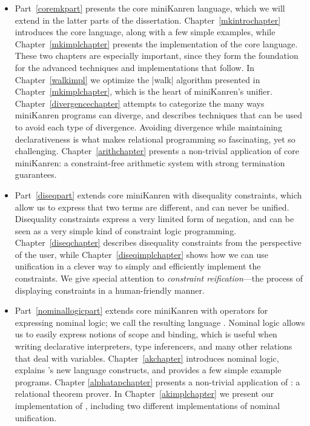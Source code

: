 \begin{itemize}

\item Part~\ref{coremkpart} presents the core miniKanren language,
  which we will extend in the latter parts of the dissertation.
  Chapter~\ref{mkintrochapter} introduces the core language, along
  with a few simple examples, while Chapter~\ref{mkimplchapter}
  presents the implementation of the core language.  These two
  chapters are especially important, since they form the foundation
  for the advanced techniques and implementations that follow.  In
  Chapter~\ref{walkimpl} we optimize the \scheme|walk| algorithm
  presented in Chapter~\ref{mkimplchapter}, which is the heart of
  miniKanren's unifier.  Chapter~\ref{divergencechapter} attempts to
  categorize the many ways miniKanren programs can diverge, and
  describes techniques that can be used to avoid each type of
  divergence.  Avoiding divergence while maintaining declarativeness is
  what makes relational programming so fascinating, yet so
  challenging.  Chapter~\ref{arithchapter} presents a non-trivial
  application of core miniKanren: a constraint-free arithmetic system
  with strong termination guarantees.
  
\item Part~\ref{diseqpart} extends core miniKanren with disequality
  constraints, which allow us to express that two terms are different,
  and can never be unified.  Disequality constraints express a very
  limited form of negation, and can be seen as a very simple kind of
  constraint logic programming.  Chapter~\ref{diseqchapter} describes
  disequality constraints from the perspective of the user, while
  Chapter~\ref{diseqimplchapter} shows how we can use unification in a
  clever way to simply and efficiently implement the constraints.  We
  give special attention to \emph{constraint reification}---the
  process of displaying constraints in a human-friendly manner.

\item Part~\ref{nominallogicpart} extends core miniKanren with
  operators for expressing nominal logic; we call the resulting
  language \alphakanren.  Nominal logic allows us to easily express
  notions of scope and binding, which is useful when writing
  declarative interpreters, type inferencers, and many other relations
  that deal with variables.  Chapter~\ref{akchapter} introduces
  nominal logic, explains \alphakanren's new language constructs, and
  provides a few simple example programs.
  Chapter
  \ref{alphatapchapter} presents a non-trivial application of
  \alphakanren: a relational theorem
  prover.  In Chapter~\ref{akimplchapter} we present our
  implementation of \alphakanren, including two different
  implementations of nominal unification.


\end{itemize}
